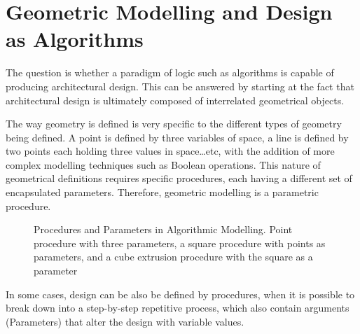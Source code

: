 \section{Geometric Modelling and Design as Algorithms}
\label{sec:GeoModel}
The question is whether a paradigm of logic such as algorithms is capable of producing architectural design. This can be answered by starting at the fact that architectural design is ultimately composed of interrelated geometrical objects.

The way geometry is defined is very specific to the different types of geometry being defined. A point is defined by three variables of space, a line is defined by two points each holding three values in space\ldots etc, with the addition of more complex modelling techniques such as Boolean operations. This nature of geometrical definitions requires specific procedures, each having a different set of encapsulated parameters. Therefore, geometric modelling is a parametric procedure. \cite{hernandez06}

\begin{figure}[htbp]
\flushleft
{}
\centering
\vspace{5mm}
\caption[Procedures and Parameters in Algorithmic Modelling]{Procedures and Parameters in Algorithmic Modelling. {\footnotesize Point procedure with three parameters, a square procedure with points as parameters, and a cube extrusion procedure with the square as a parameter}}
\label{SqrAnalysis}
\end{figure}

In some cases, design can be also be defined by procedures, when it is possible to break down into a step-by-step repetitive process, which also contain arguments (Parameters) that alter the design with variable values. \label{SequentialAlgorithms}

